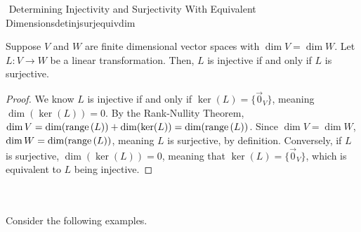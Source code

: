         \begin{theorem}{\Stop\,\,Determining Injectivity and Surjectivity With Equivalent Dimensions}{detinjsurjequivdim}
            
            Suppose \(V\) and \(W\) are finite dimensional vector spaces with \(\dim V=\dim W\). Let \(L:V\to W\) be a linear transformation. Then, \(L\) is injective if and only if \(L\) is surjective.
            \begin{proof}
                We know \(L\) is injective if and only if \(\ker(L)=\{\vec{0}_V\}\), meaning \(\dim (\ker(L))=0\). By the Rank-Nullity Theorem, \(\dim V=\dim(\text{range\,}(L))+\dim(\ker(L))=\dim(\text{range\,}(L))\). Since \(\dim V=\dim W\), \(\dim W=\dim(\text{range\,}(L))\), meaning \(L\) is surjective, by definition. Conversely, if \(L\) is surjective, \(\dim(\ker(L))=0\), meaning that \(\ker(L)=\{\vec{0}_V\}\), which is equivalent to \(L\) being injective.
            \end{proof}

        \end{theorem}
        \pagebreak
        \vphantom
        \\
        \\
        Consider the following examples.
